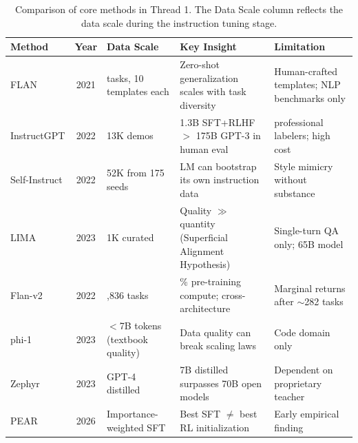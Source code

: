 \begin{table}[!ht]
\centering
\caption{Comparison of core methods in Thread 1. The Data Scale column reflects the data scale during the instruction tuning stage.}
\label{tab:sft-comparison}
\small
\begin{tabularx}{\textwidth}{l c >{\raggedright\arraybackslash}p{2.2cm} >{\raggedright\arraybackslash}X >{\raggedright\arraybackslash}X}
\toprule
\textbf{Method} & \textbf{Year} & \textbf{Data Scale} & \textbf{Key Insight} & \textbf{Limitation} \\
\midrule
FLAN & 2021 & 62 tasks, 10 templates each & Zero-shot generalization scales with task diversity & Human-crafted templates; NLP benchmarks only \\
InstructGPT & 2022 & 13K demos & 1.3B SFT+RLHF $>$ 175B GPT-3 in human eval & 40 professional labelers; high cost \\
Self-Instruct & 2022 & 52K from 175 seeds & LM can bootstrap its own instruction data & Style mimicry without substance \\
LIMA & 2023 & 1K curated & Quality $\gg$ quantity (Superficial Alignment Hypothesis) & Single-turn QA only; 65B model \\
Flan-v2 & 2022 & 1,836 tasks & 0.2\% pre-training compute; cross-architecture & Marginal returns after $\sim$282 tasks \\
phi-1 & 2023 & $<$7B tokens (textbook quality) & Data quality can break scaling laws & Code domain only \\
Zephyr & 2023 & GPT-4 distilled & 7B distilled surpasses 70B open models & Dependent on proprietary teacher \\
PEAR & 2026 & Importance-weighted SFT & Best SFT $\neq$ best RL initialization & Early empirical finding \\
\bottomrule
\end{tabularx}
\end{table}

